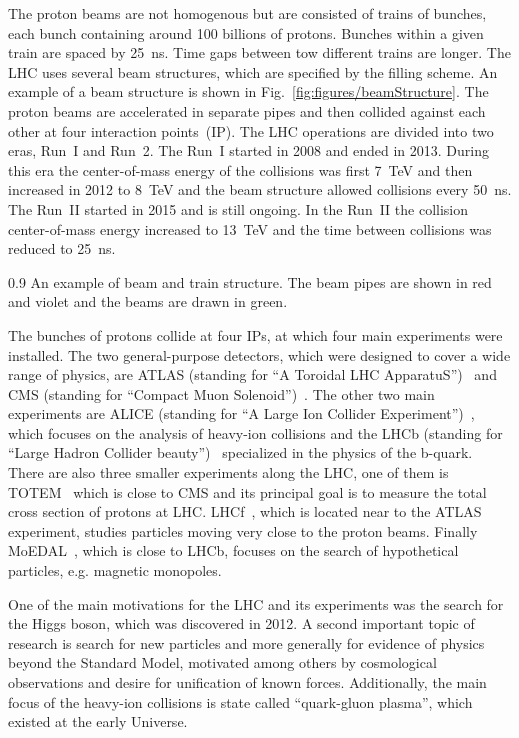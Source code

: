 The proton beams are not homogenous but are consisted of trains of bunches, each bunch containing around 100 billions of protons. Bunches within a given train are spaced by 25~ns. Time gaps between tow different trains are longer. The LHC uses several beam structures, which are specified by the filling scheme. An example of a beam structure is shown in Fig.~\ref{fig:figures/beamStructure}. The proton beams are accelerated in separate pipes and then collided against each other at four interaction points~(IP). The LHC operations are divided into two eras, Run~I and Run~2. The Run~I started in 2008 and ended in 2013. During this era the center-of-mass energy of the collisions was first 7~TeV and then increased in 2012 to 8~TeV and the beam structure allowed collisions every 50~ns. The Run~II started in 2015 and is still ongoing. In the Run~II the collision center-of-mass energy increased to 13~TeV and the time between collisions was reduced to 25~ns.

                 {0.9}       %
                 { An example of beam and train structure. The beam pipes are shown in red and violet and the beams are drawn in green. }

The bunches of protons collide at four IPs, at which four main experiments were installed. The two general-purpose detectors, which were designed to cover a wide range of physics, are ATLAS (standing for ``A Toroidal  LHC ApparatuS'')~\cite{Aad:2008zzm} and CMS (standing for ``Compact Muon Solenoid'')~\cite{Chatrchyan:2008aa}. The other two main experiments are ALICE (standing for ``A Large Ion Collider Experiment'')~\cite{Aamodt:2008zz}, which focuses on the analysis of heavy-ion collisions and the LHCb (standing for ``Large Hadron Collider beauty'')~\cite{Alves:2008zz} specialized in the physics of the b-quark. There are also three smaller experiments along the LHC, one of them is TOTEM~\cite{Anelli:2008zza} which is close to CMS and its principal goal is to measure the total cross section of protons at LHC. LHCf~\cite{Adriani:2008zz}, which is located near to the ATLAS experiment, studies particles moving very close to the proton beams. Finally MoEDAL~\cite{Acharya:2014nyr}, which is close to LHCb, focuses on the search of hypothetical particles, e.g. magnetic monopoles.

One of the main motivations for the LHC and its experiments was the search for the Higgs boson, which was discovered in 2012. A second important topic of research is search for new particles and more generally for evidence of physics beyond the Standard Model, motivated among others by cosmological observations and desire for unification of known forces. Additionally, the main focus of the  heavy-ion collisions is state called ``quark-gluon plasma'', which existed at the early Universe.

